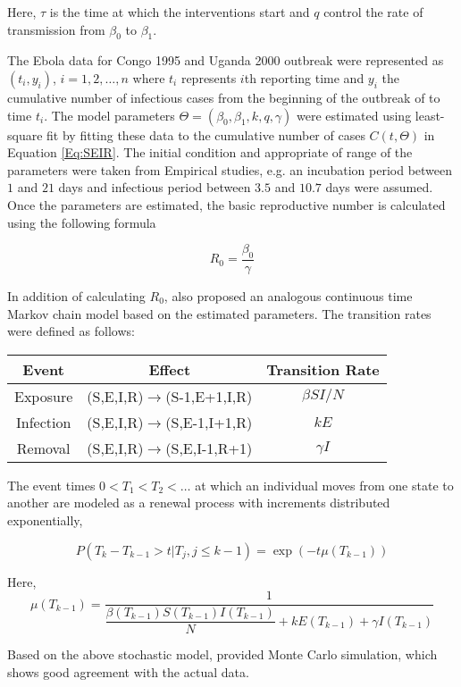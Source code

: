 \documentclass[12pt, journal,onecolumn]{IEEEtran}
\begin{document}
Here, $\tau$ is the time at which the interventions start and $q$ control the rate of transmission from $\beta_0$ to $\beta_1$.

The Ebola data for Congo 1995 and Uganda 2000 outbreak were represented as $(t_i,y_i)$, $i=1,2,\ldots,n$ where $t_i$ represents $i$th reporting time and $y_i$ the cumulative number of infectious cases from the beginning of the outbreak of to time $t_i$.  The model parameters $\Theta=(\beta_0,\beta_1,k,q,\gamma)$ were estimated using least-square fit by fitting these data to the cumulative number of cases $C(t,\Theta)$ in Equation \ref{Eq:SEIR}. The initial condition and appropriate of range of the parameters were taken from Empirical studies, e.g. an incubation period between $1$ and $21$ days and infectious period between $3.5$ and $10.7$ days were assumed. Once the parameters are estimated, the basic reproductive number is calculated using the following formula

\begin{equation}
R_0 = \dfrac{\beta_0}{\gamma}
\end{equation}


In addition of calculating $R_0$, \cite{chowell2004basic} also proposed an analogous continuous time Markov chain model based on the estimated parameters. The transition rates were defined as follows:

\begin{center}
\begin{tabular}{|c|c|c|}
\hline 
Event & Effect & Transition Rate\tabularnewline
\hline 
\hline 
Exposure & (S,E,I,R)$\to$(S-1,E+1,I,R) & $\beta SI/N$\tabularnewline
\hline 
Infection & (S,E,I,R)$\to$(S,E-1,I+1,R) & $kE$\tabularnewline
\hline 
Removal & (S,E,I,R)$\to$(S,E,I-1,R+1) & $\gamma I$\tabularnewline
\hline 
\end{tabular}
\end{center}


The event times $0<T_1<T_2<\ldots$ at which an individual moves from one state to another are modeled as a renewal process with increments distributed exponentially,

\begin{equation}
P(T_k-T_{k-1} > t | T_j, j\leq k-1) = \exp(-t \mu (T_{k-1}) )
\end{equation}

Here, 
\[
\mu (T_{k-1}) = \frac{1}{\dfrac{\beta(T_{k-1}) S(T_{k-1}) I(T_{k-1})}{N} + k E(T_{k-1}) + \gamma I(T_{k-1})}
\]

Based on the above stochastic model, \cite{chowell2004basic} provided Monte Carlo simulation, which shows good agreement with the actual data.
\end{document}
